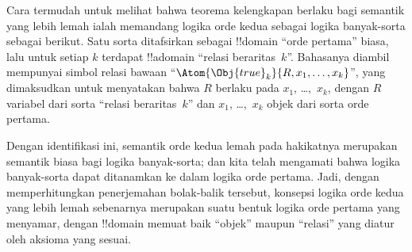 \documentclass[../../../include/open-logic-section]{subfiles}
\begin{document}
Cara termudah untuk melihat bahwa teorema kelengkapan berlaku bagi semantik
yang lebih lemah ialah memandang logika orde kedua sebagai logika banyak-sorta
sebagai berikut. Satu sorta ditafsirkan sebagai !!{domain} ``orde pertama''
biasa, lalu untuk setiap $k$ terdapat !!a{domain} ``relasi beraritas~$k$''.
Bahasanya diambil mempunyai simbol relasi bawaan
``$\Atom{\Obj{true}_k}{R,x_1,\dots,x_k}$'', yang dimaksudkan untuk menyatakan
bahwa $R$ berlaku pada $x_1$, \dots,~$x_k$, dengan $R$ variabel dari sorta
``relasi beraritas~$k$'' dan $x_1$, \dots,~$x_k$ objek dari sorta orde pertama.

Dengan identifikasi ini, semantik orde kedua lemah pada hakikatnya merupakan
semantik biasa bagi logika banyak-sorta; dan kita telah mengamati bahwa logika
banyak-sorta dapat ditanamkan ke dalam logika orde pertama. Jadi, dengan
memperhitungkan penerjemahan bolak-balik tersebut, konsepsi logika orde kedua
yang lebih lemah sebenarnya merupakan suatu bentuk logika orde pertama yang
menyamar, dengan !!{domain} memuat baik ``objek'' maupun ``relasi'' yang
diatur oleh aksioma yang sesuai.
\end{document}
